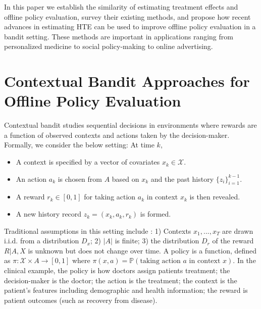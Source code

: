 \documentclass{article}
\begin{document}
In this paper we establish the similarity of estimating treatment effects and offline policy evaluation, survey their existing methods, and propose how recent advances in estimating HTE can be used to improve offline policy evaluation in a bandit setting. These methods are important in applications ranging from personalized medicine to social policy-making to online advertising.



\section{Contextual Bandit Approaches for Offline Policy Evaluation}
Contextual bandit studies sequential decisions in environments where rewards are a function of observed contexts and actions taken by the decision-maker. Formally, we consider the below setting: 
At time $k$, 
\begin{itemize}
    \item A context is specified by a vector of covariates $x_k \in \mathcal{X}.$
    \item An action $a_k$ is chosen from $A$ based on $x_k$ and the past history $\{z_i\}_{i=1}^{k-1}$.
    \item A reward $r_k \in [0,1]$ for taking action $a_k$ in context $x_k$ is then revealed. 
    \item A new history record $z_k = (x_k, a_k, r_k)$ is formed.
\end{itemize}
Traditional assumptions in this setting include \cite{dudik2014doubly}: 1) Contexts $x_1, ..., x_T$ are drawn i.i.d. from a distribution $D_x$; 2) $|A|$ is finite; 3) the distribution $D_r$ of the reward $R|A, X$ is unknown but does not change over time. A policy is a function, defined as $\pi: \mathcal{X} \times A \to [0,1]$ where $\pi(x, a) = \mathbb{P}(\text{taking action } a \text{ in context } x).$ In the clinical example, the policy is how doctors assign patients treatment; the decision-maker is the doctor; the action is the treatment; the context is the patient's features including demographic and health information; the reward is patient outcomes (such as recovery from disease). 
\end{document}
